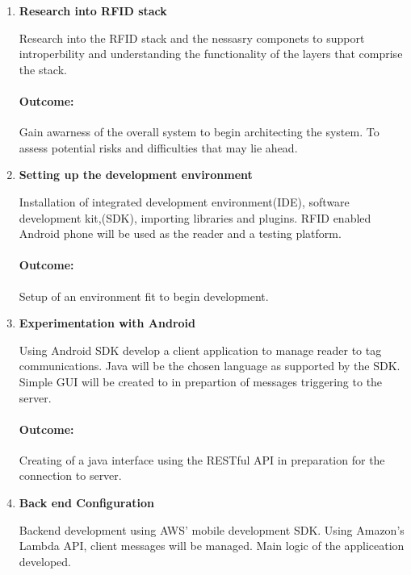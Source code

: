 \documentclass[a4paper, 11pt]{article}
\begin{document}
{\begin{enumerate}
   \item \textbf{Research into RFID stack}
   	\begin{flushleft}Research into the RFID stack and the nessasry componets to support introperbility and understanding the functionality of the layers that comprise the stack.
	\paragraph{Outcome:} Gain awarness of the overall system to begin architecting the system. To assess potential risks and difficulties that may lie ahead.
\end{flushleft}

   \item \textbf{Setting up the development environment}
   	\begin{flushleft}Installation of integrated development environment(IDE), software development kit,(SDK), importing libraries and plugins. RFID enabled Android phone will be used as the reader and a testing platform.  
		\paragraph{Outcome:} Setup of an environment fit to begin development.
		\end{flushleft}
	  \vspace{\baselineskip}

	   \item \textbf{Experimentation with Android}
   	\begin{flushleft}Using Android SDK develop a client application to manage reader to tag communications. Java will be the chosen language as supported by the SDK. Simple GUI will be created to in prepartion of messages triggering to the server.
	
	\paragraph{Outcome:} 
	Creating of a java interface using the RESTful API in preparation for the connection to server.  	\end{flushleft}
	\vspace{\baselineskip}
  
   \item \textbf{Back end Configuration }
   	\begin{flushleft}Backend development using AWS' mobile development SDK. Using Amazon's Lambda API, client messages will be managed. Main logic of the appliceation developed.

\end{flushleft}
\end{enumerate}}
\end{document}
